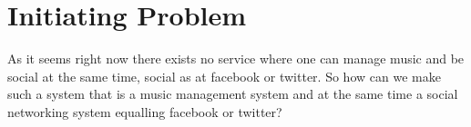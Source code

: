 \section{Initiating Problem}
As it seems right now there exists no service where one can manage music and be social at the same time, social as at facebook or twitter. So how can we make such a system that is a music management system and at the same time a social networking system equalling facebook or twitter?